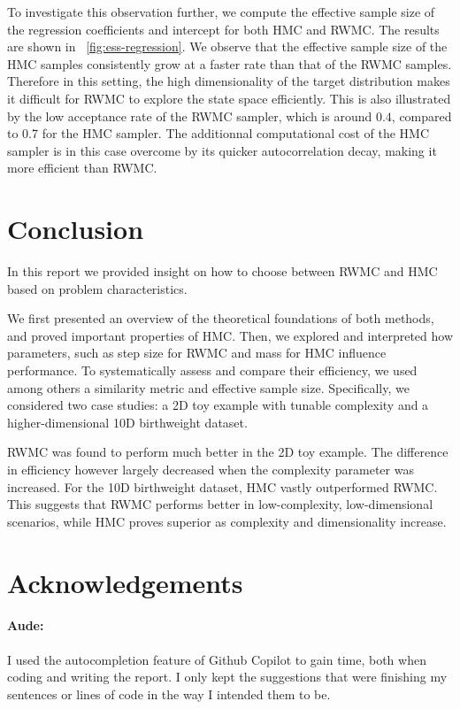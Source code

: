 \documentclass[a4paper, 12pt,oneside]{article}
\begin{document}
		To investigate this observation further, we compute the effective sample size of the regression coefficients and intercept for both HMC and RWMC. The results are shown in ~\ref{fig:ess-regression}. We observe that the effective sample size of the HMC samples consistently grow at a faster rate than that of the RWMC samples. Therefore in this setting, the high dimensionality of the target distribution makes it difficult for RWMC to explore the state space efficiently. This is also illustrated by the low acceptance rate of the RWMC sampler, which is around $0.4$, compared to 0.7 for the HMC sampler. The additionnal computational cost of the HMC sampler is in this case overcome by its quicker autocorrelation decay, making it more efficient than RWMC.
	\section{Conclusion}
	In this report we provided insight on how to choose between RWMC and HMC based on problem characteristics. 
	
	We first presented an overview of the theoretical foundations of both methods, and proved important properties of HMC.	
	Then, we explored and interpreted how parameters, such as step size for RWMC and mass for HMC influence performance. To systematically assess and compare their efficiency, we used among others a similarity metric and effective sample size. 
	Specifically, we considered two case studies: a 2D toy example with tunable complexity and a higher-dimensional 10D birthweight dataset. 
	
	RWMC was found to perform much better in the 2D toy example. The difference in efficiency however largely decreased when the complexity parameter was increased. For the 10D birthweight dataset, HMC vastly outperformed RWMC.  
	This suggests that RWMC performs better in low-complexity, low-dimensional scenarios, while HMC proves superior as complexity and dimensionality increase.
	\newpage
	\section*{Acknowledgements}
		\paragraph{Aude:}
		I used the autocompletion feature of Github Copilot to gain time, both when coding and writing the report. I only kept the suggestions that were finishing my sentences or lines of code in the way I intended them to be.
\end{document}
